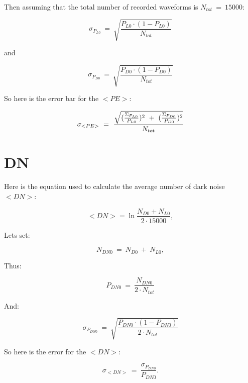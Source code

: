 \documentclass[a4paper, 11pt]{report}%
\begin{document}
  Then assuming that the total number of recorded waveforms is $N_{tot}\ =\ 15000$:
  
  \begin{equation}
    \sigma_{P_{L0}}\ =\ \sqrt{\frac{P_{L0}\cdot(1-P_{L0})}{N_{tot}}}
  \end{equation}

  and 
  
  \begin{equation}
    \sigma_{P_{D0}}\ =\ \sqrt{\frac{P_{D0}\cdot(1-P_{D0})}{N_{tot}}}
  \end{equation}
  
  So here is the error bar for the $<PE>$:
  
  \begin{equation}
    \sigma_{<PE>}\ =\ \frac{\sqrt{
    (\frac{\Sigma_{P_{L0}}}{P_{L0}})\textsuperscript{2}\ +\ 
    (\frac{\Sigma_{P_{D0}}}{P_{D0}})\textsuperscript{2}
    }}{N_{tot}}
  \end{equation}
    
  \section{DN}
  
  Here is the equation used to calculate the average number of dark noise $<DN>$:

  \begin{equation}
    <DN> = \ln{\frac{N_{D0}+N_{L0}}{2\cdot15000}},
  \end{equation}

  Lets set:
  
  \begin{equation}
    N_{DN0}\ =\ N_{D0}\ +\ N_{L0},  
  \end{equation}
  
  Thus:
  
  \begin{equation}
    P_{DN0}\ =\ \frac{N_{DN0}}{2\cdot N_{tot}}
  \end{equation}
  
  And:
  
  \begin{equation}
    \sigma_{P_{DN0}}\ =\ \sqrt{\frac{P_{DN0}\cdot(1-P_{DN0})}{2\cdot N_{tot}}}  
  \end{equation}
  
  So here is the error for the $<DN>$:
  
  \begin{equation}
    \sigma_{<DN>}\ =\ \frac{\sigma_{P_{DN0}}}{P_{DN0}}.
  \end{equation}
  
\end{document}
